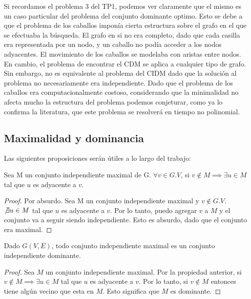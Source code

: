 Si recordamos el problema 3 del TP1, podemos ver claramente que el mismo es un caso particular del problema del conjunto dominante optimo. Esto se debe a que el problema de los caballos imponía cierta estructura sobre el grafo en el que se efectuaba la búsqueda. El grafo en si no era completo, dado que cada casilla era representada por un nodo, y un caballo no podía acceder a los nodos adyacentes. El movimiento de los caballos se modelaba con aristas entre nodos. En cambio, el problema de encontrar el CDM se aplica a cualquier tipo de grafo. Sin embargo, no es equivalente al problema del CIDM dado que la solución al problema no necesariamente era independiente. Dado que el problema de los caballos era computacionalmente costoso, considerando que la minimalidad no afecta mucho la estructura del problema podemos conjeturar, como ya lo confirma la literatura, que este problema se resolverá en tiempo no polinomial.

\subsection{Maximalidad y dominancia}

Las siguientes proposiciones serán útiles a lo largo del trabajo:

\begin{proposition}
Sea M un conjunto independiente maximal de G. $\forall v \in G.V$, si $v \notin M \implies \exists u \in M$ tal que $u$ es adyacente a $v$. 
\end{proposition}

\begin{proof}
Por absurdo. Sea M un conjunto independiente maximal y $v \notin G.V$. $\not\exists u \in M$ tal que $u$ es adyacente a $v$. Por lo tanto, puedo agregar $v$ a $M$ y el conjunto va a seguir siendo independiente. Esto es absurdo, dado que el conjunto era maximal.
\end{proof}

\begin{proposition}
Dado $G(V,E)$, todo conjunto independiente maximal es un conjunto independiente dominante.
\end{proposition}

\begin{proof}
Sea $M$ un conjunto independiente maximal. Por la propiedad anterior, si $v \notin M \implies \exists u \in M$ tal que $u$ es adyacente a $v$. Por lo tanto, si $v \notin M$ entonces tiene algún vecino que esta en $M$. Esto significa que $M$ es dominante.
\end{proof}


